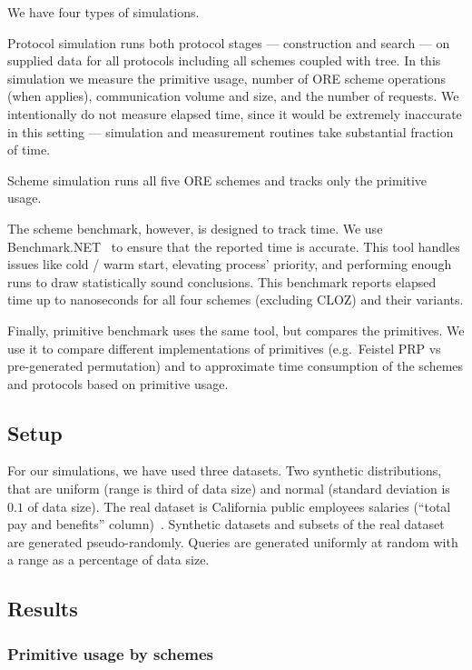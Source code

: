 			

			We have four types of simulations.

			Protocol simulation runs both protocol stages --- construction and search --- on supplied data for all protocols including all schemes coupled with {\BPlus} tree.
			In this simulation we measure the primitive usage, number of ORE scheme operations (when applies), communication volume and size, and the number of {\IO} requests.
			We intentionally do not measure elapsed time, since it would be extremely inaccurate in this setting --- simulation and measurement routines take substantial fraction of time.

			Scheme simulation runs all five ORE schemes and tracks only the primitive usage.

			The scheme benchmark, however, is designed to track time.
			We use Benchmark.NET~\cite{benchmark-net} to ensure that the reported time is accurate.
			This tool handles issues like cold / warm start, elevating process' priority, and performing enough runs to draw statistically sound conclusions.
			This benchmark reports elapsed time up to nanoseconds for all four schemes (excluding CLOZ) and their variants.

			Finally, primitive benchmark uses the same tool, but compares the primitives.
			We use it to compare different implementations of primitives (e.g.\ Feistel PRP vs pre-generated permutation) and to approximate time consumption of the schemes and protocols based on primitive usage.

	\subsection{Setup}

		For our simulations, we have used three datasets.
		Two synthetic distributions, that are uniform (range is third of data size) and normal (standard deviation is $0.1$ of data size).
		The real dataset is California public employees salaries (``total pay and benefits'' column)~\cite{ca-dataset}.
		Synthetic datasets and subsets of the real dataset are generated pseudo\hyp{}randomly.
		Queries are generated uniformly at random with a range as a percentage of data size.

	\subsection{Results}

		\subsubsection{Primitive usage by schemes}\label{sec:schemes-primitive-usage}

